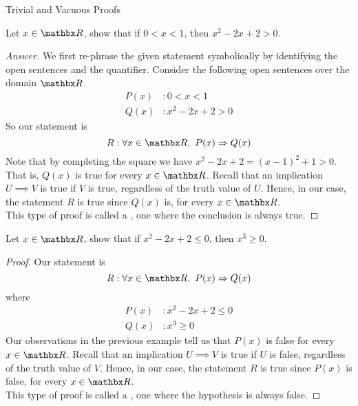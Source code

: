 \begin{mdframed}
\begin{center}
{\Large Trivial and Vacuous Proofs}
\end{center}
\end{mdframed}

\begin{example}
Let $x \in \rr$, show that if $0 < x < 1$, then $x^2 - 2x + 2 > 0$.
\end{example}
\begin{proof}[Answer]
We first re-phrase the given statement symbolically by identifying the open sentences and the quantifier. Consider the following open sentences over the domain $\rr$
\begin{align*}
P(x)&:0 < x < 1\\[0.5em]
Q(x)&:x^2 - 2x + 2 > 0
\end{align*}
So our statement is 
\[R:\forall x \in \rr,\ P(x) \implies Q(x)\]
Note that by completing the square we have $x^2 - 2x + 2 = (x - 1)^2 + 1 > 0$. That is, $Q(x)$ is true for every $x \in \rr$. Recall that an implication $U \implies V$ is true if $V$ is true, regardless of the truth value of $U$. Hence, in our case, the statement $R$ is true since $Q(x)$ is, for every $x \in \rr$.\\[0.5em]
This type of proof is called a , one where the conclusion is always true.
\end{proof}

\vspace*{1em}

\begin{example}
Let $x \in \rr$, show that if $x^2 - 2x + 2 \leq 0$, then $x^3 \geq 0$.
\end{example}
\begin{proof}
Our statement is
\[R:\forall x \in \rr,\ P(x) \implies Q(x)\]
where
\begin{align*}
P(x)&:x^2 - 2x + 2 \leq 0\\[0.5em]
Q(x)&:x^3 \geq 0
\end{align*}
Our observations in the previous example tell us that $P(x)$ is false for every $x \in \rr$. Recall that an implication $U \implies V$ is true if $U$ is false, regardless of the truth value of $V$. Hence, in our case, the statement $R$ is true since $P(x)$ is false, for every $x \in \rr$.\\[0.5em]
This type of proof is called a , one where the hypothesis is always false.
\end{proof}

